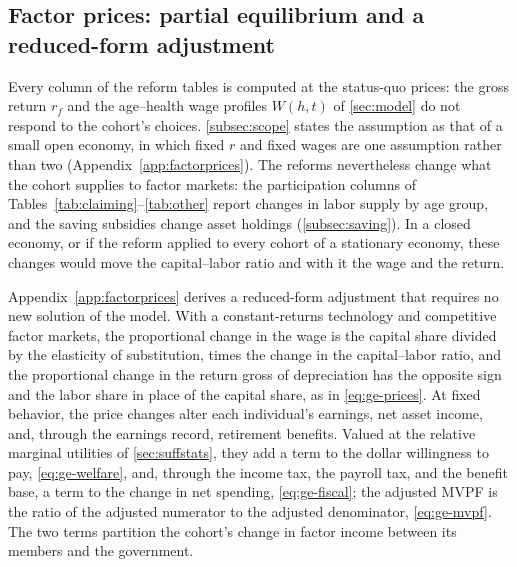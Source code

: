 \subsection{Factor prices: partial equilibrium and a reduced-form adjustment}\label{subsec:factorprices}

Every column of the reform tables is computed at the status-quo prices: the gross return $r_f$ and the age--health wage profiles $W(h,t)$ of \autoref{sec:model} do not respond to the cohort's choices. \autoref{subsec:scope} states the assumption as that of a small open economy, in which fixed $r$ and fixed wages are one assumption rather than two (Appendix~\ref{app:factorprices}). The reforms nevertheless change what the cohort supplies to factor markets: the participation columns of Tables~\ref{tab:claiming}--\ref{tab:other} report changes in labor supply by age group, and the saving subsidies change asset holdings (\autoref{subsec:saving}). In a closed economy, or if the reform applied to every cohort of a stationary economy, these changes would move the capital--labor ratio and with it the wage and the return. %

Appendix~\ref{app:factorprices} derives a reduced-form adjustment that requires no new solution of the model. With a constant-returns technology and competitive factor markets, the proportional change in the wage is the capital share divided by the elasticity of substitution, times the change in the capital--labor ratio, and the proportional change in the return gross of depreciation has the opposite sign and the labor share in place of the capital share, as in \eqref{eq:ge-prices}. At fixed behavior, the price changes alter each individual's earnings, net asset income, and, through the earnings record, retirement benefits. Valued at the relative marginal utilities of \autoref{sec:suffstats}, they add a term to the dollar willingness to pay, \eqref{eq:ge-welfare}, and, through the income tax, the payroll tax, and the benefit base, a term to the change in net spending, \eqref{eq:ge-fiscal}; the adjusted MVPF is the ratio of the adjusted numerator to the adjusted denominator, \eqref{eq:ge-mvpf}. The two terms partition the cohort's change in factor income between its members and the government.

